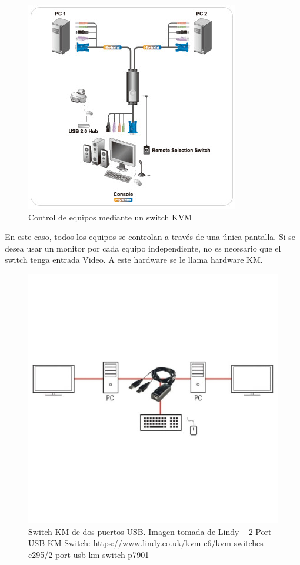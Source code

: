\begin{figure}[h!]
\centering
\includegraphics[scale = 0.7]{capitulo_01/figuras_dir/KVM.jpg}
\caption{Control de equipos mediante un switch KVM}
\label{fig:switchKVM}
\end{figure}

En este caso, todos los equipos se controlan a través de una única pantalla. Si se desea usar un monitor por cada equipo independiente, no es necesario que el switch tenga entrada Video. A este hardware se le llama hardware KM.

\begin{figure}
\centering
\includegraphics[scale = 0.5]{capitulo_01/figuras_dir/KMSwitch.jpg}
\caption{Switch KM de dos puertos USB. Imagen tomada de Lindy – 2 Port USB KM Switch: https://www.lindy.co.uk/kvm-c6/kvm-switches-c295/2-port-usb-km-switch-p7901}
\label{fig:switchKM}
\end{figure}

